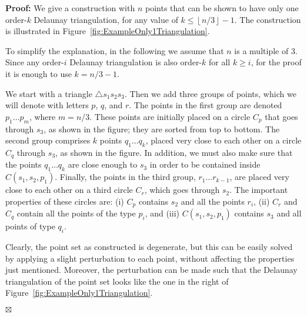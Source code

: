 \documentclass {journal}
\newenvironment {proof}{\textbf {Proof:}}{\hfill \ensuremath {\boxtimes}}
\begin{document}
\begin{proof}
We give a construction with $n$ points that can be shown to have only one order-$k$ Delaunay triangulation, for any value of  $k \leq \left\lfloor n/3\right\rfloor -1$. The construction is illustrated in Figure~\ref{fig:ExampleOnly1Triangulation}.

To simplify the explanation, in the following we assume that $n$ is a multiple of 3.
Since any order-$i$ Delaunay triangulation is also order-$k$ for all $k \geq i$, for the proof it is enough to use $k = n/3 -1$.


We start with a triangle $\triangle s_1 s_2 s_3$. Then we add
three groups of points, which we will denote with letters $p$,
$q$, and $r$. The points in the first group are
denoted $p_1 \dots p_m$, where $m=n/3$. These points are initially
placed on a circle $C_p$ that goes through $s_3$, as shown in the
figure; they are sorted from top to bottom. The second group
comprises $k$ points $q_1 \dots q_k$, placed very close to each
other on a circle $C_q$ through $s_3$, as shown in the figure. In
addition, we must also make sure that the points $q_1 \dots q_k$
are close enough to $s_3$ in order to be contained inside
$C(s_1,s_2,p_1)$. Finally, the points in the third group, $r_1
\dots r_{k-1}$, are placed very close to each other on a third
circle $C_r$, which goes through $s_2$. The important properties
of these circles are:
(i) $C_p$ contains $s_2$ and all the points $r_i$,
(ii) $C_r$ and $C_q$ contain all the points of the type $p_i$,
and
(iii) $C(s_1,s_2,p_1)$ contains $s_3$ and all points of type $q_i$.

Clearly, the point set as constructed is degenerate, but this can be easily solved by applying a slight perturbation to each point, without affecting the properties just mentioned.
Moreover, the perturbation can be made such that the Delaunay triangulation of the point set looks like the one in the right of Figure~\ref{fig:ExampleOnly1Triangulation}.


\end{proof}
\end{document}
